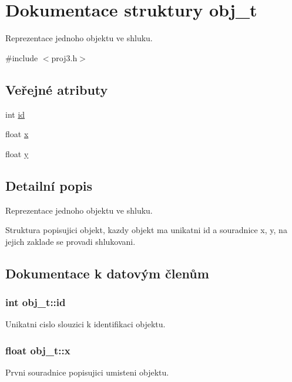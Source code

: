 \hypertarget{structobj__t}{}\section{Dokumentace struktury obj\+\_\+t}
\label{structobj__t}


Reprezentace jednoho objektu ve shluku.  




{\ttfamily \#include $<$proj3.\+h$>$}

\subsection*{Veřejné atributy}
\begin{DoxyCompactItemize}
\item 
int \hyperlink{structobj__t_a603ae185ae536cecefa2015ad574d4a3}{id}
\item 
float \hyperlink{structobj__t_af688845648ce2b4781c232c475d9fa81}{x}
\item 
float \hyperlink{structobj__t_a1101f5b48ee96a247c71aa8a33feb2bb}{y}
\end{DoxyCompactItemize}


\subsection{Detailní popis}
Reprezentace jednoho objektu ve shluku. 

Struktura popisujici objekt, kazdy objekt ma unikatni \textquotesingle{}id\textquotesingle{} a souradnice \textquotesingle{}x\textquotesingle{}, \textquotesingle{}y\textquotesingle{}, na jejich zaklade se provadi shlukovani. 

\subsection{Dokumentace k datovým členům}
\subsubsection[{\texorpdfstring{id}{id}}]{\setlength{\rightskip}{0pt plus 5cm}int obj\+\_\+t\+::id}\hypertarget{structobj__t_a603ae185ae536cecefa2015ad574d4a3}{}\label{structobj__t_a603ae185ae536cecefa2015ad574d4a3}
Unikatni cislo slouzici k identifikaci objektu. 
\subsubsection[{\texorpdfstring{x}{x}}]{\setlength{\rightskip}{0pt plus 5cm}float obj\+\_\+t\+::x}\hypertarget{structobj__t_af688845648ce2b4781c232c475d9fa81}{}\label{structobj__t_af688845648ce2b4781c232c475d9fa81}
Prvni souradnice popisujici umisteni objektu. 
